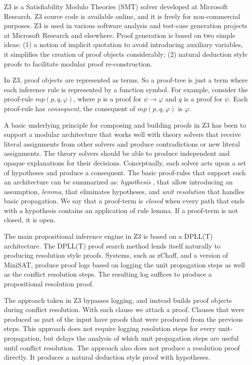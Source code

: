 \documentclass{llncs}
\begin{document}
Z3 is a Satisfiability Modulo Theories (SMT) solver developed at
Microsoft Research.  Z3 source code is available online, and it is
freely for non-commercial purposes.  Z3 is used in various software
analysis and test-case generation projects at Microsoft Research and
elsewhere.  Proof generation is based on two simple ideas: (1) a
notion of implicit quotation to avoid introducing auxiliary variables,
it simplifies the creation of proof objects considerably; (2) natural
deduction style proofs to facilitate modular proof re-construction.


In Z3, proof objects are represented as terms. So a proof-tree is just a term
where each inference rule is represented by a function symbol.
For example, consider the proof-rule $mp(p, q, \varphi)$, where $p$ is a proof for
$\psi \rightarrow \varphi$ and $q$ is a proof for $\psi$. Each proof-rule has
\emph{consequent}, the consequent of $mp(p, q, \varphi)$ is $\varphi$.

A basic underlying principle for composing and building proofs in Z3 has been to support a modular
architecture that works well with theory solvers that receive literal assignments from other solvers and
produce contradictions or new literal assignments. The theory solvers should be able to produce independent
and opaque explanations for their decisions.
Conceptually, each solver acts upon a set of hypotheses and produce a consequent. The basic proof-rules
that support such an architecture can be summarized as: \emph{hypothesis} , that allow introducing an
assumption, \emph{lemma}, that eliminates hypotheses, and \emph{unit resolution} that handles basic propagation.
We say that a proof-term is \emph{closed} when every path that ends with a hypothesis contains an application
of rule lemma. If a proof-term is not closed, it is open.

The main propositional inference engine in Z3 is based on a DPLL(T) architecture.
The DPLL(T) proof search method lends itself naturally to producing resolution style proofs.
Systems, such as zChaff, and a version of MiniSAT, produce proof logs based on logging the
unit propagation steps as well as the conflict resolution steps. The resulting log suffices to produce a
propositional resolution proof.

The approach taken in Z3 bypasses logging, and instead builds proof
objects during conflict resolution.  With each clause we attach a
proof. Clauses that were produced as part of the input have proofs
that were produced from the previous steps. This approach does not
require logging resolution steps for every unit-propagation, but
delays the analysis of which unit propagation steps are useful until
conflict resolution. The approach also does not produce a resolution
proof directly. It produces a natural deduction style proof with
hypotheses.
\end{document}
